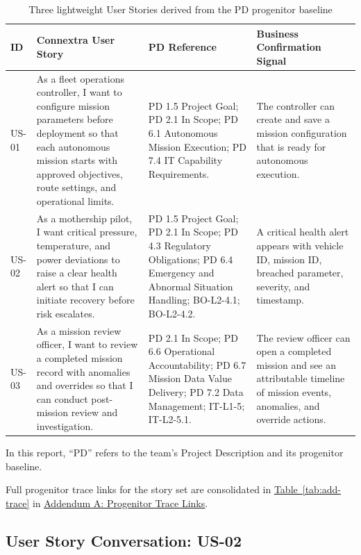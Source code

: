 \documentclass[10pt,a4paper]{article}
\let\orighyperref\hyperref
\renewcommand{\hyperref}[2][]{\orighyperref[#1]{\uline{#2}}}
\begin{document}
\begin{table}[H]
\centering
\small
\renewcommand{\arraystretch}{1.25}
\begin{tabularx}{\textwidth}{|P{0.09\textwidth}|Y|P{0.27\textwidth}|P{0.18\textwidth}|}
\hline
{}
\textbf{ID} & \textbf{Connextra User Story} & \textbf{PD Reference} & \textbf{Business Confirmation Signal} \\
\hline
\hypertarget{us01}{US-01} & As a fleet operations controller, I want to configure mission parameters before deployment so that each autonomous mission starts with approved objectives, route settings, and operational limits. & PD 1.5 Project Goal; PD 2.1 In Scope; PD 6.1 Autonomous Mission Execution; PD 7.4 IT Capability Requirements. & The controller can create and save a mission configuration that is ready for autonomous execution. \\
\hline
\hypertarget{us02}{US-02} & As a mothership pilot, I want critical pressure, temperature, and power deviations to raise a clear health alert so that I can initiate recovery before risk escalates. & PD 1.5 Project Goal; PD 2.1 In Scope; PD 4.3 Regulatory Obligations; PD 6.4 Emergency and Abnormal Situation Handling; BO-L2-4.1; BO-L2-4.2. & A critical health alert appears with vehicle ID, mission ID, breached parameter, severity, and timestamp. \\
\hline
\hypertarget{us03}{US-03} & As a mission review officer, I want to review a completed mission record with anomalies and overrides so that I can conduct post-mission review and investigation. & PD 2.1 In Scope; PD 6.6 Operational Accountability; PD 6.7 Mission Data Value Delivery; PD 7.2 Data Management; IT-L1-5; IT-L2-5.1. & The review officer can open a completed mission and see an attributable timeline of mission events, anomalies, and override actions. \\
\hline
\end{tabularx}
\caption{Three lightweight User Stories derived from the PD progenitor baseline}
\label{tab:user-stories}
\end{table}

\noindent In this report, ``PD'' refers to the team's Project Description and its progenitor baseline.

\noindent Full progenitor trace links for the story set are consolidated in \hyperref[tab:add-trace]{Table~\ref*{tab:add-trace}} in \hyperref[add:trace]{Addendum A: Progenitor Trace Links}.

\subsection*{User Story Conversation: US-02}
{}
\label{sec:us02-conversation}
\end{document}
